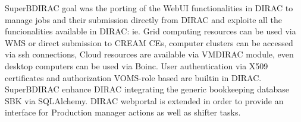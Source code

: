 \documentclass[a4paper]{jpconf}
\begin{document}
SuperBDIRAC goal was the porting of the WebUI functionalities in DIRAC to manage jobs and their submission directly from DIRAC and exploite all the funcionalities available in DIRAC: ie. Grid computing resources can be used via WMS or direct submission to CREAM CEs, computer clusters can be accessed via ssh connections, Cloud resources are available via VMDIRAC module, even desktop computers can be used via Boinc. User authentication via X509 certificates and authorization VOMS-role based are builtin in DIRAC.
SuperBDIRAC enhance DIRAC integrating the generic bookkeeping database SBK via SQLAlchemy.
DIRAC webportal is extended in order to provide an interface for Production manager actions as well as shifter tasks.


 
\end{document}
